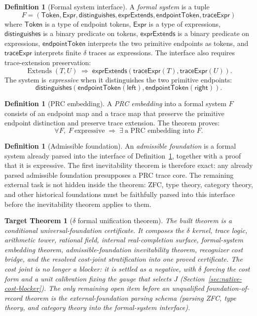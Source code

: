 \documentclass[11pt,a4paper]{article}
\newtheorem{target}[theorem]{Target Theorem}
\theoremstyle{definition}
\newtheorem{definition}[theorem]{Definition}
\theoremstyle{remark}
\begin{document}
\begin{definition}[Formal system interface]\label{def:admformal}
A \emph{formal system} is a tuple
\[
  F = (\mathsf{Token}, \mathsf{Expr}, \mathsf{distinguishes},
  \mathsf{exprExtends}, \mathsf{endpointToken}, \mathsf{traceExpr})
\]
where $\mathsf{Token}$ is a type of endpoint tokens, $\mathsf{Expr}$ is a type
of expressions, $\mathsf{distinguishes}$ is a binary predicate on tokens,
$\mathsf{exprExtends}$ is a binary predicate on expressions,
$\mathsf{endpointToken}$ interprets the two primitive endpoints as tokens, and
$\mathsf{traceExpr}$ interprets finite $\delta$ traces as expressions. The
interface also requires trace-extension preservation:
\[
  \operatorname{Extends}(T,U)
  \;\Longrightarrow\;
  \mathsf{exprExtends}(\mathsf{traceExpr}(T),\mathsf{traceExpr}(U)).
\]
The system is \emph{expressive} when it distinguishes the two primitive
endpoints:
\[
  \mathsf{distinguishes}
  (\mathsf{endpointToken}(\mathsf{left}),
   \mathsf{endpointToken}(\mathsf{right})).
\]
\end{definition}

\begin{definition}[PRC embedding]\label{def:prcembedding}
A \emph{PRC embedding} into a formal system $F$ consists of an endpoint map
and a trace map that preserve the primitive endpoint distinction and preserve
trace extension. The theorem proves:
\[
  \forall F,\; F\ \text{expressive}
  \;\Longrightarrow\;
  \exists\ \text{a PRC embedding into }F.
\]
\end{definition}

\begin{definition}[Admissible foundation]\label{def:admissiblefoundation}
An \emph{admissible foundation} is a formal system already parsed into the
interface of Definition~\ref{def:admformal}, together with a proof that it is
expressive. The first inevitability theorem is therefore exact: any already
parsed admissible foundation presupposes a PRC trace core. The remaining
external task is not hidden inside the theorem: ZFC, type theory, category
theory, and other historical foundations must be faithfully parsed into this
interface before the inevitability theorem applies to them.
\end{definition}

\begin{target}[$\delta$ formal unification theorem]\label{tgt:main}
The built theorem is a \emph{conditional universal-foundation certificate}.
It composes the $\delta$ kernel, trace logic, arithmetic tower, rational field,
internal real-completion surface, formal-system embedding theorem,
admissible-foundation inevitability theorem, recognizer cost bridge, and the
resolved cost-joint stratification into one proved certificate. The cost joint
is no longer a blocker: it is settled as a negative, with $\delta$ forcing the
cost form and a unit calibration fixing the gauge that selects $J$
(Section~\ref{sec:native-cost-blocker}). The only remaining open item before an
unqualified foundation-of-record theorem is the external-foundation parsing
schema (parsing ZFC, type theory, and category theory into the formal-system
interface).
\end{target}
\end{document}

